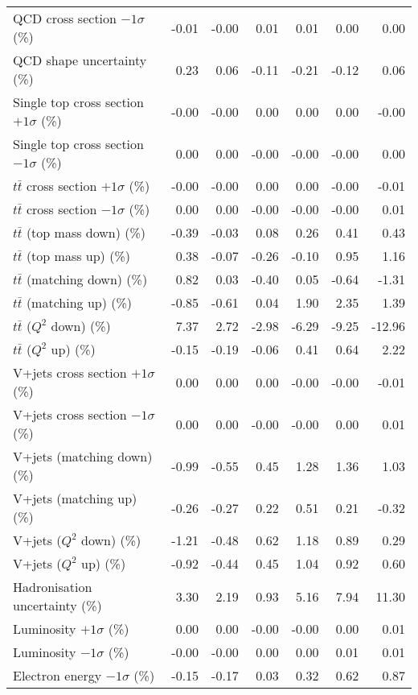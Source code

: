 \begin{table}[htbp]
{\begin{tabular}{lrrrrrr}
QCD cross section \ensuremath{-1\sigma} (\%) & -0.01 & -0.00 & 0.01 & 0.01 & 0.00 & 0.00 \\ 
QCD shape uncertainty (\%) & 0.23 & 0.06 & -0.11 & -0.21 & -0.12 & 0.06 \\ 
Single top cross section $+1\sigma$ (\%) & -0.00 & -0.00 & 0.00 & 0.00 & 0.00 & -0.00 \\ 
Single top cross section $-1\sigma$ (\%) & 0.00 & 0.00 & -0.00 & -0.00 & -0.00 & 0.00 \\ 
$t\bar{t}$ cross section $+1\sigma$ (\%) & -0.00 & -0.00 & 0.00 & 0.00 & -0.00 & -0.01 \\ 
$t\bar{t}$ cross section $-1\sigma$ (\%) & 0.00 & 0.00 & -0.00 & -0.00 & -0.00 & 0.01 \\ 
$t\bar{t}$ (top mass down) (\%) & -0.39 & -0.03 & 0.08 & 0.26 & 0.41 & 0.43 \\ 
$t\bar{t}$ (top mass up) (\%) & 0.38 & -0.07 & -0.26 & -0.10 & 0.95 & 1.16 \\ 
$t\bar{t}$ (matching down) (\%) & 0.82 & 0.03 & -0.40 & 0.05 & -0.64 & -1.31 \\ 
$t\bar{t}$ (matching up) (\%) & -0.85 & -0.61 & 0.04 & 1.90 & 2.35 & 1.39 \\ 
$t\bar{t}$ ($Q^{2}$ down) (\%) & 7.37 & 2.72 & -2.98 & -6.29 & -9.25 & -12.96 \\ 
$t\bar{t}$ ($Q^{2}$ up) (\%) & -0.15 & -0.19 & -0.06 & 0.41 & 0.64 & 2.22 \\ 
V+jets cross section \ensuremath{+1\sigma} (\%) & 0.00 & 0.00 & 0.00 & -0.00 & -0.00 & -0.01 \\ 
V+jets cross section \ensuremath{-1\sigma} (\%) & 0.00 & 0.00 & -0.00 & -0.00 & 0.00 & 0.01 \\ 
V+jets (matching down) (\%) & -0.99 & -0.55 & 0.45 & 1.28 & 1.36 & 1.03 \\ 
V+jets (matching up) (\%) & -0.26 & -0.27 & 0.22 & 0.51 & 0.21 & -0.32 \\ 
V+jets ($Q^{2}$ down) (\%) & -1.21 & -0.48 & 0.62 & 1.18 & 0.89 & 0.29 \\ 
V+jets ($Q^{2}$ up) (\%) & -0.92 & -0.44 & 0.45 & 1.04 & 0.92 & 0.60 \\ 
Hadronisation uncertainty (\%) & 3.30 & 2.19 & 0.93 & 5.16 & 7.94 & 11.30 \\ 
Luminosity $+1\sigma$ (\%) & 0.00 & 0.00 & -0.00 & -0.00 & 0.00 & 0.01 \\ 
Luminosity $-1\sigma$ (\%) & -0.00 & -0.00 & 0.00 & 0.00 & 0.01 & 0.01 \\ 
Electron energy $-1\sigma$ (\%) & -0.15 & -0.17 & 0.03 & 0.32 & 0.62 & 0.87 \\ 

\end{tabular}}
\end{table}
